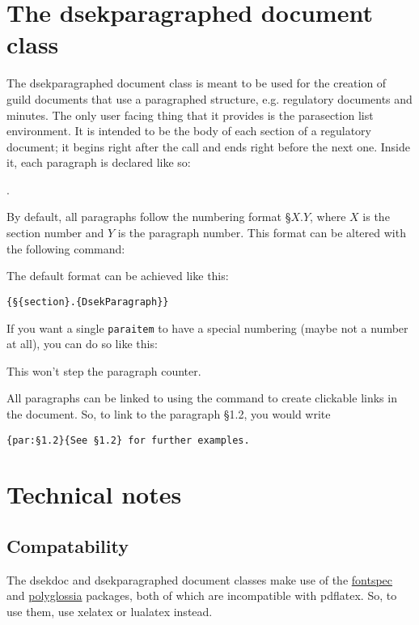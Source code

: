 \documentclass[a4paper, oneside]{ltxdoc}
\begin{document}
\section{The \textsf{dsekparagraphed} document class}
The \textsf{dsekparagraphed} document class is meant to be used for the creation
of guild documents that use a paragraphed structure, e.g. regulatory documents
and minutes.  The only user facing thing that it provides is the
\textsf{parasection} list environment.  It is intended to be the body of each
section of a regulatory document; it begins right after the  call
and ends right before the next one.  Inside it, each paragraph is declared like
so:

\begin{center}
  .
\end{center}

By default, all paragraphs follow the numbering format §\(X.Y\), where \(X\) is
the section number and \(Y\) is the paragraph number.  This format can be
altered with the following command:

\begin{center}
\end{center}

The default format can be achieved like this:

\begin{center}
  \texttt{\{§\{section\}.\{DsekParagraph\}\}}
\end{center}

If you want a single \texttt{paraitem} to have a special numbering (maybe not a
number at all), you can do so like this:

\begin{center}
\end{center}

This won't step the paragraph counter.

All paragraphs can be linked to using the  command to create
clickable links in the document.  So, to link to the paragraph §1.2, you would
write

\begin{center}
  \texttt{\{par:§1.2\}\{See §1.2\} for further examples.}
\end{center}

\section{Technical notes}

\subsection{Compatability}

The \textsf{dsekdoc} and \textsf{dsekparagraphed} document classes make use of
the \href{https://ctan.org/pkg/fontspec}{\textsf{fontspec}} and
\href{https://ctan.org/pkg/polyglossia}{\textsf{polyglossia}} packages, both of
which are incompatible with \textsf{pdflatex}.  So, to use them, use
\textsf{xelatex} or \textsf{lualatex} instead.
\end{document}
